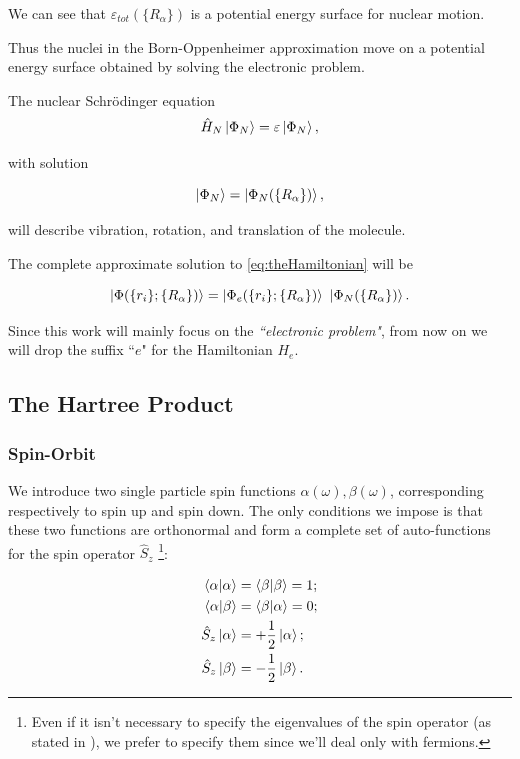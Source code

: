 \documentclass[a4paper,12pt]{article}
\begin{document}
We can see that $\varepsilon_{tot}(\{ R_{\alpha}\})$ is a potential energy surface for nuclear motion.

Thus the nuclei in the Born-Oppenheimer approximation move on a potential energy surface obtained by solving the electronic problem.

The nuclear Schr\"odinger equation  
\begin{equation}
	\hat{H}_{N} \ket{\Phi_{N}} = \varepsilon \ket{\Phi_{N} },
\end{equation}

with solution 

\begin{equation}
	\ket{\Phi_{N}}=\ket{\Phi_{N}(\{R_{\alpha}\})},
\end{equation}

will describe vibration, rotation, and translation of the molecule.

The complete approximate solution to \eqref{eq:theHamiltonian} will be  \cite[p.43-45]{Attila}

\begin{equation}
	\ket{ \Phi(\{r_i\};\{R_{\alpha}\}) } 	= \ket{ \Phi_{e}(\{r_i\};\{R_{\alpha}\})} 
											~ \ket{ \Phi_{N}(\{R_{\alpha}\})}.
\end{equation}

Since this work will mainly focus on the \textit{``electronic problem"}, from now on we will drop the suffix ``$e$" for the Hamiltonian $H_{e}$.

\subsection{The Hartree Product}
\subsubsection{Spin-Orbit}
We introduce two single particle spin functions  $\alpha(\omega), \beta(\omega)$, corresponding respectively to spin up and spin down.
The only conditions we impose is that these two functions are orthonormal and form a complete set of auto-functions for the spin operator $\hat{S}_z$ \footnote{Even if it isn't necessary to specify the eigenvalues of the spin operator (as stated in \cite{Attila}), we prefer to specify them since we'll deal only with fermions. }:

\begin{align*}
	\bra{\alpha}\ket{\alpha} & = \bra{\beta}\ket{\beta} = 1; \\
	\bra{\alpha}\ket{\beta} & = \bra{\beta}\ket{\alpha} = 0; \\
	\hat{S}_{z} \ket{\alpha} & = + \frac{1}{2} \ket{\alpha}; \\
	\hat{S}_{z} \ket{\beta} & = - \frac{1}{2} \ket{\beta}. \\
\end{align*}
\end{document}
